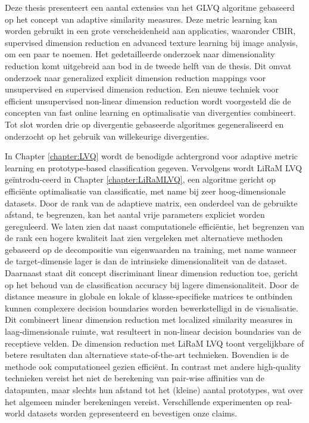 \documentclass[10pt,fleqn]{phdthesis}%
\begin{document}
\samenvatting
% 
Deze thesis presenteert een aantal extensies van het \ac{GLVQ} algoritme gebaseerd op het concept van adaptive similarity measures. 
Deze metric learning kan worden gebruikt in een grote verscheidenheid aan applicaties, waaronder \ac{CBIR}, supervised dimension reduction 
en advanced texture learning bij image analysis, om een paar te noemen. 
Het gedetailleerde onderzoek naar dimensionality reduction komt uitgebreid aan bod in de tweede helft van de thesis. 
Dit omvat onderzoek naar generalized explicit dimension reduction mappings voor unsupervised en supervised dimension reduction. 
Een nieuwe techniek voor efficient unsupervised non-linear dimension reduction wordt voorgesteld die de concepten van fast online learning 
en optimalisatie van divergenties combineert. 
Tot slot worden drie op divergentie gebaseerde algoritmes gegeneraliseerd en onderzocht op het gebruik van willekeurige divergenties.

In Chapter \ref{chapter:LVQ} wordt de benodigde achtergrond voor adaptive metric learning en prototype-based classification gegeven. 
Vervolgens wordt \ac{LiRaM LVQ} ge\"introdu-ceerd in Chapter \ref{chapter:LiRaMLVQ}, een algoritme gericht op effici\"ente optimalisatie 
van classificatie, met name bij zeer hoog-dimensionale datasets. 
Door de rank van de adaptieve matrix, een onderdeel van de gebruikte afstand, te begrenzen, kan het aantal vrije parameters expliciet 
worden gereguleerd. 
We laten zien dat naast computationele effici\"entie, het begrenzen van de rank een hogere kwaliteit laat zien vergeleken met alternatieve 
methoden gebaseerd op de decompositie van eigenwaarden na training, met name wanneer de target-dimensie lager is dan de intrinsieke 
dimensionaliteit van de dataset. 
Daarnaast staat dit concept discriminant linear dimension reduction toe, gericht op het behoud van de classification accuracy bij 
lagere dimensionaliteit. 
Door de distance measure in globale en lokale of klasse-specifieke matrices te ontbinden kunnen complexere decision boundaries worden 
bewerkstelligd in de visualisatie. 
Dit combineert linear dimension reduction met localized similarity measures in laag-dimensionale ruimte, wat resulteert in non-linear 
decision boundaries van de receptieve velden. 
De dimension reduction met \ac{LiRaM LVQ} toont vergelijkbare of betere resultaten dan alternatieve state-of-the-art technieken. 
Bovendien is de methode ook computationeel gezien effici\"ent. In contrast met andere high-quality technieken vereist het niet de 
berekening van pair-wise affinities van de datapunten, maar slechts hun afstand tot het (kleine) aantal prototypes, wat over het 
algemeen minder berekeningen vereist. Verschillende experimenten op real-world datasets worden gepresenteerd en bevestigen onze claims.
\end{document}
